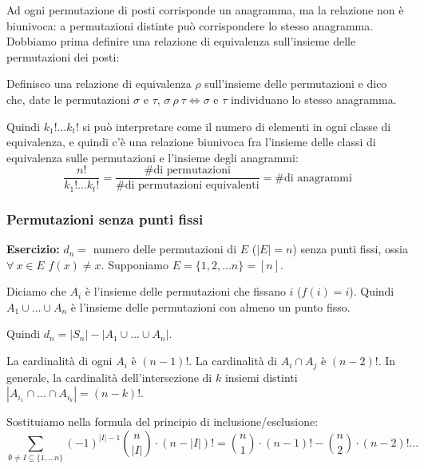 Ad ogni permutazione di posti corrisponde un anagramma, ma la relazione non \`e biunivoca: a permutazioni distinte pu\`o corrispondere lo stesso anagramma. Dobbiamo prima definire una relazione di equivalenza sull'insieme delle permutazioni dei posti:
\begin{defn}
Definisco una relazione di equivalenza $\rho$ sull'insieme delle permutazioni e dico che, date le permutazioni $\sigma$ e $\tau$, $\sigma \ \rho \ \tau \Leftrightarrow \sigma$ e $\tau$ individuano lo stesso anagramma.
\end{defn}
Quindi $k_1! \dots k_t!$ si pu\`o interpretare come il numero di elementi in ogni classe di equivalenza, e quindi c'\`e una relazione biunivoca fra l'insieme delle classi di equivalenza sulle permutazioni e l'insieme degli anagrammi:
\[
\frac{n!}{k_1! \dots k_t!} = \frac{\text{\# di permutazioni}}{\text{\# di permutazioni equivalenti}} = \text{\# di anagrammi}
\]

\subsubsection{Permutazioni senza punti fissi}

\textbf{Esercizio:} $d_n = $ numero delle permutazioni di $E$ ($|E| = n$) senza punti fissi, ossia $\forall \ x \in E $ $ f(x) \neq x$. Supponiamo $E = \{1, 2, \dots n \} = [n]$.

Diciamo che $A_i$ \`e l'insieme delle permutazioni che fissano $i$ ($f(i) = i$). Quindi $A_1 \cup \dots \cup A_n$ \`e l'insieme delle permutazioni con almeno un punto fisso.

Quindi $d_n = |S_n| - |A_1 \cup \dots \cup A_n|$.

La cardinalit\`a di ogni $A_i$ \`e $(n - 1)!$. La cardinalit\`a di $A_i \cap A_j $ \`e $(n - 2)!$. In generale, la cardinalit\`a dell'intersezione di $k$ insiemi distinti $|A_{i_1} \cap \dots \cap A_{i_k}| = (n - k)!$.

Sostituiamo nella formula del principio di inclusione/esclusione:
\[
\sum_{\emptyset \neq I \subseteq \{1, \dots n \}} (-1)^{|I| - 1} \binom{n}{|I|} \cdot (n - |I|)! =
\binom{n}{1} \cdot (n-1)! - \binom{n}{2} \cdot (n - 2)! \dots
\]









